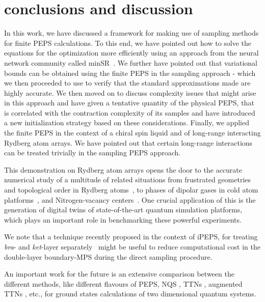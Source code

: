\documentclass[aps,notitlepage,twocolumn,nofootinbib,superscriptaddress,pra,10pt]{revtex4-2}
\begin{document}
\section{conclusions and discussion}
In this work, we have discussed a framework for making use of sampling methods for finite PEPS calculations. 
To this end, we have pointed out how to solve the equations for the optimization more efficiently using an approach from the neural network community called minSR~\cite{chen2024minSR}.
We further have pointed out that variational bounds can be obtained using the finite PEPS in the sampling approach - which we then proceeded to use to verify that the standard approximations made are highly accurate. 
We then moved on to discuss complexity issues that might arise in this approach and have given a tentative quantity of the physical PEPS, that is correlated with the contraction complexity of its samples and have introduced a new initialization strategy based on these considerations.
Finally, we applied the finite PEPS in the context of a chiral spin liquid and of long-range interacting Rydberg atom arrays. We have pointed out that certain long-range interactions can be treated trivially in the sampling PEPS approach.

This demonstration on Rydberg atom arrays opens the door to the accurate numerical study of a multitude of related situations from frustrated geometries and topological order in Rydberg atoms~\cite{Verresen21_topoRyd, Semenghini21_topoRyd_Exp}, to phases of dipolar gases in cold atom platforms~\cite{Lahaye_2009_dipolar_gases}, and Nitrogen-vacancy centers~\cite{NV_centers1,NV_centers2}. 
One crucial application of this is the generation of digital twins of state-of-the-art quantum simulation platforms, which plays an important role in benchmarking these powerful experiments.

We note that a technique recently proposed in the context of iPEPS, for treating \textit{bra}- and \textit{ket}-layer separately~\cite{naumann2025variationallyoptimizinginfiniteprojected} might be useful to reduce computational cost in the double-layer boundary-MPS during the direct sampling procedure.

An important work for the future is an extensive comparison between the different methods, like different flavours of PEPS, NQS \cite{Carleo17_NQS}, TTNs \cite{Shi06_TTN,Tagliacozzo09_TTN, Rizzi19_anthology}, augmented TTNs \cite{augm_trees}, etc., for ground states calculations of two dimensional quantum systems.
\end{document}
